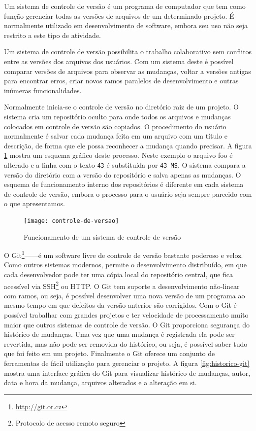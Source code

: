 Um sistema de controle de versão é um programa de computador que tem
como função gerenciar todas as versões de arquivos de um determinado
projeto. É normalmente utilizado em desenvolvimento de software,
embora seu uso não seja restrito a este tipo de atividade.

Um sistema de controle de versão possibilita o trabalho colaborativo
sem conflitos entre as versões dos arquivos dos usuários. Com um
sistema deste é possível comparar versões de arquivos para observar as
mudanças, voltar a versões antigas para encontrar erros, criar novos
ramos paralelos de desenvolvimento e outras inúmeras funcionalidades.

Normalmente inicia-se o controle de versão no diretório raiz de um
projeto. O sistema cria um repositório oculto para onde todos os
arquivos e mudanças colocados em controle de versão são copiados. O
procedimento do usuário normalmente é salvar cada mudança feita em um
arquivo com um título e descrição, de forma que ele possa reconhecer a
mudança quando precisar. A figura \ref{fig:controle-de-versao} mostra
um esquema gráfico deste processo. Neste exemplo o arquivo foo é
alterado e a linha com o texto \verb!43! é substituída por
\verb!43 MS!. O sistema compara a versão do diretório com a versão do
repositório e salva apenas as mudanças. O esquema de funcionamento
interno dos repositórios é diferente em cada sistema de controle de
versão, embora o processo para o usuário seja sempre parecido com o
que apresentamos.

\begin{figure}
  \centering
  \texttt{[image: controle-de-versao]}
  \caption{Funcionamento de um sistema de controle de versão}
  \label{fig:controle-de-versao}
\end{figure}

O Git\footnote{\url{http://git.or.cz}}------é um software livre de controle de versão bastante
poderoso e veloz. Como outros sistemas modernos, permite o
desenvolvimento distribuído, em que cada desenvolvedor pode ter uma
cópia local do repositório central, que fica acessível via
SSH\footnote{Protocolo de acesso remoto seguro} ou HTTP. O Git tem
suporte a desenvolvimento não-linear com ramos, ou seja, é possível
desenvolver uma nova versão de um programa ao mesmo tempo em que
defeitos da versão anterior são corrigidos. Com o Git é possível
trabalhar com grandes projetos e ter velocidade de processamento muito
maior que outros sistemas de controle de versão. O Git proporciona
segurança do histórico de mudanças. Uma vez que uma mudança é
registrada ela pode ser revertida, mas não pode ser removida do
histórico, ou seja, é possível saber tudo que foi feito em um
projeto. Finalmente o Git oferece um conjunto de ferramentas de fácil
utilização para gerenciar o projeto. A figura \ref{fig:historico-git}
mostra uma interface gráfica do Git para visualizar histórico de
mudanças, autor, data e hora da mudança, arquivos alterados e a
alteração em si.

